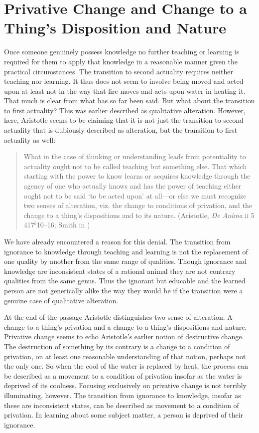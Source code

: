 \section{Privative Change and Change to a Thing's Disposition and Nature} %
\label{sec:privative_and_nonprivative_change}

Once someone genuinely possess knowledge no further teaching or learning is required for them to apply that knowledge in a reasonable manner given the practical circumstances. The transition to second actuality requires neither teaching nor learning. It thus does not seem to involve being moved and acted upon at least not in the way that fire moves and acts upon water in heating it. That much is clear from what has so far been said. But what about the transition to first actuality? This was earlier described as qualitative alteration. However, here, Aristotle seems to be claiming that it is not just the transition to second actuality that is dubiously described as alteration, but the transition to first actuality as well:
\begin{quote}
	What in the case of thinking or understanding leads from potentiality to actuality ought not to be called teaching but something else. That which starting with the power to know learns or acquires knowledge through the agency of one who actually knows and has the power of teaching either ought not to be said `to be acted upon' at all---or else we must recognize two senses of alteration, viz. the change to conditions of privation, and the change to a thing's dispositions and to its nature. (Aristotle, \emph{De Anima} \textsc{ii} 5 417\( ^{b} \)10--16; Smith in \citealt[30--31]{Barnes:1984uq})
\end{quote}
We have already encountered a reason for this denial. The transition from ignorance to knowledge through teaching and learning is not the replacement of one quality by another from the same range of qualities. Though ignorance and knowledge are inconsistent states of a rational animal they are not contrary qualities from the same genus. Thus the ignorant but educable and the learned person are not generically alike the way they would be if the transition were a genuine case of qualitative alteration. 

At the end of the passage Aristotle distinguishes two sense of alteration. A change to a thing's privation and a change to a thing's dispositions and nature. Privative change seems to echo Aristotle's earlier notion of destructive change. The destruction of something by its contrary is a change to a condition of privation, on at least one reasonable understanding of that notion, perhaps not the only one. So when the cool of the water is replaced by heat, the process can be described as a movement to a condition of privation insofar as the water is deprived of its coolness. Focusing exclusively on privative change is not terribly illuminating, however. The transition from ignorance to knowledge, insofar as these are inconsistent states, can be described as movement to a condition of privation. In learning about some subject matter, a person is deprived of their ignorance. 


